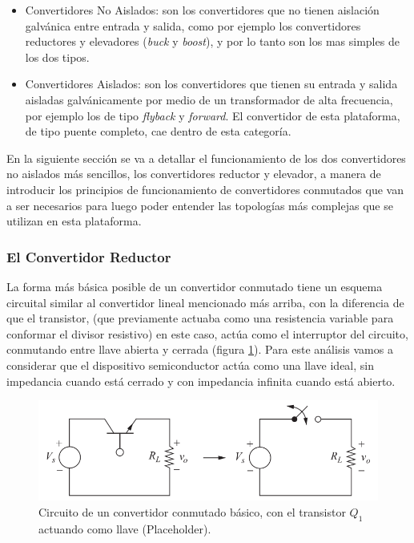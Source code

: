 \begin{itemize}
    \item {\SemiBold Convertidores No Aislados:} son los convertidores que no tienen aislación galvánica entre entrada y salida, como por ejemplo los convertidores reductores y elevadores (\textit{buck} y \textit{boost}), y por lo tanto son los mas simples de los dos tipos.
    \item {\SemiBold Convertidores Aislados:} son los convertidores que tienen su entrada y salida aisladas galvánicamente por medio de un transformador de alta frecuencia, por ejemplo los de tipo \textit{flyback} y \textit{forward}. El convertidor de esta plataforma, de tipo puente completo, cae dentro de esta categoría.
\end{itemize}

En la siguiente sección se va a detallar el funcionamiento de los dos convertidores no aislados más sencillos, los convertidores reductor y elevador, a manera de introducir los principios de funcionamiento de convertidores conmutados que van a ser necesarios para luego poder entender las topologías más complejas que se utilizan en esta plataforma.\\

\subsubsection{El Convertidor Reductor}

La forma más básica posible de un convertidor conmutado tiene un esquema circuital similar al convertidor lineal mencionado más arriba, con la diferencia de que el transistor, (que previamente actuaba como una resistencia variable para conformar el divisor resistivo) en este caso, actúa como el interruptor del circuito, conmutando entre llave abierta y cerrada (figura \ref{proto_reductor}). Para este análisis vamos a considerar que el dispositivo semiconductor actúa como una llave ideal, sin impedancia cuando está cerrado y con impedancia infinita cuando está abierto.

\begin{figure}[H]
    \centering
    \includegraphics[scale=0.4]{Imagenes/Proto Reductor.png}
    \caption{Circuito de un convertidor conmutado básico, con el transistor $Q_1$ actuando como llave (Placeholder).}
    \label{proto_reductor}
\end{figure}

